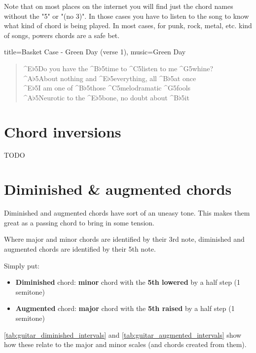 Note that on most places on the internet you will find just the chord names without the "5" or "(no 3)". In those cases you have to listen to the song to know what kind of chord is being played. In most cases, for punk, rock, metal, etc. kind of songs, powers chords are a safe bet.

\begin{song}[verse/numbered, align-chords=l]{title={Basket Case - Green Day (verse 1)}, music={Green Day}}
	\begin{verse}
		^{E$\flat$5}Do you have the ^{B$\flat$5}time to ^{C5}listen to me ^{G5}whine? \\
		^{A$\flat$5}About nothing and ^{E$\flat$5}everything, all ^{B$\flat$5}at once \\
		^{E$\flat$5}I am one of ^{B$\flat$5}those ^{C5}melodramatic ^{G5}fools \\
		^{A$\flat$5}Neurotic to the ^{E$\flat$5}bone, no doubt about ^{B$\flat$5}it \\
	\end{verse}
\end{song}

\newpage

\section{Chord inversions}
TODO

\newpage

\section{Diminished \& augmented chords}

Diminished and augmented chords have sort of an uneasy tone. This makes them great as a passing chord to bring in some tension.

Where major and minor chords are identified by their 3rd note, diminished and augmented chords are identified by their 5th note.

Simply put:

\begin{itemize}
	\item \textbf{Diminished} chord: \textbf{minor} chord with the \textbf{5th lowered} by a half step (1 semitone)
	\item \textbf{Augmented} chord: \textbf{major} chord with the \textbf{5th raised} by a half step (1 semitone)
\end{itemize}

\autoref{tab:guitar_diminished_intervals} and \autoref{tab:guitar_augmented_intervals} show how these relate to the major and minor scales (and chords created from them).

